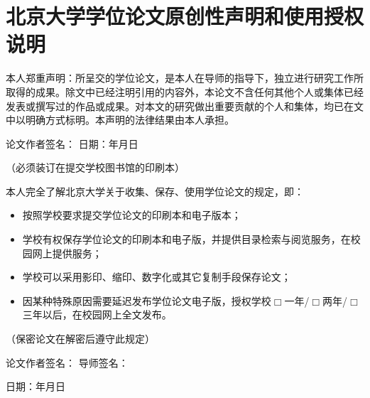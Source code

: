 \chapter*{北京大学学位论文原创性声明和使用授权说明}

\begin{center}
\end{center}

\bigskip

本人郑重声明：所呈交的学位论文，是本人在导师的指导下，独立进行研究工作所取得的成果。除文中已经注明引用的内容外，本论文不含任何其他个人或集体已经发表或撰写过的作品或成果。对本文的研究做出重要贡献的个人和集体，均已在文中以明确方式标明。本声明的法律结果由本人承担。

\bigskip

\begin{center}
    论文作者签名： \qquad\qquad 日期：\qquad 年\quad 月\quad 日
\end{center}

\bigskip

\begin{center}

（必须装订在提交学校图书馆的印刷本）
\end{center}

\bigskip

本人完全了解北京大学关于收集、保存、使用学位论文的规定，即：
\begin{itemize}
    \item 按照学校要求提交学位论文的印刷本和电子版本；
    \item 学校有权保存学位论文的印刷本和电子版，并提供目录检索与阅览服务，在校园网上提供服务；
    \item 学校可以采用影印、缩印、数字化或其它复制手段保存论文；
    \item 因某种特殊原因需要延迟发布学位论文电子版，授权学校$\Box$一年/$\Box$两年/$\Box$三年以后，在校园网上全文发布。
\end{itemize}{}

\begin{center}
（保密论文在解密后遵守此规定）
\end{center}

\bigskip

\begin{center}
论文作者签名： \qquad\qquad 导师签名：\qquad\qquad    

日期：\qquad 年\quad 月\quad 日
\end{center}


{
	\fancyhf{}
	\fancyfoot[CO,CE]{~\thepage~}
	\renewcommand{\headrulewidth}{0.7pt}
	\renewcommand{\footrulewidth}{0pt}
}
\fancyhf{}
\fancyfoot[CO,CE]{~\thepage~}
\renewcommand{\headrulewidth}{0.7pt}
\renewcommand{\footrulewidth}{0pt}